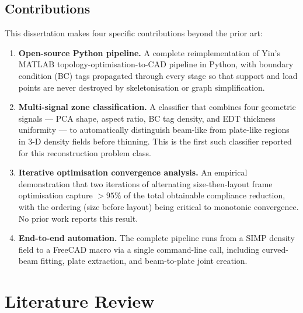 \documentclass[11pt,a4paper]{article}
\begin{document}
\subsection{Contributions}
\label{subsec:contributions}

This dissertation makes four specific contributions beyond the prior art:

\begin{enumerate}
    \item \textbf{Open-source Python pipeline.}
          A complete reimplementation of Yin's \cite{yin2020} MATLAB
          topology-optimisation-to-CAD pipeline in Python, with boundary
          condition (BC) tags propagated through every stage so that support
          and load points are never destroyed by skeletonisation or graph
          simplification.

    \item \textbf{Multi-signal zone classification.}
          A classifier that combines four geometric signals --- PCA shape,
          aspect ratio, BC tag density, and EDT thickness uniformity --- to
          automatically distinguish beam-like from plate-like regions in 3-D
          density fields before thinning.
          This is the first such classifier reported for this reconstruction
          problem class.

    \item \textbf{Iterative optimisation convergence analysis.}
          An empirical demonstration that two iterations of alternating
          size-then-layout frame optimisation capture $>95\%$ of the total
          obtainable compliance reduction, with the ordering (size before
          layout) being critical to monotonic convergence.
          No prior work reports this result.

    \item \textbf{End-to-end automation.}
          The complete pipeline runs from a SIMP density field to a
          FreeCAD macro via a single command-line call, including curved-beam
          fitting, plate extraction, and beam-to-plate joint creation.
\end{enumerate}

\section{Literature Review}
\label{sec:litreview}
\end{document}
